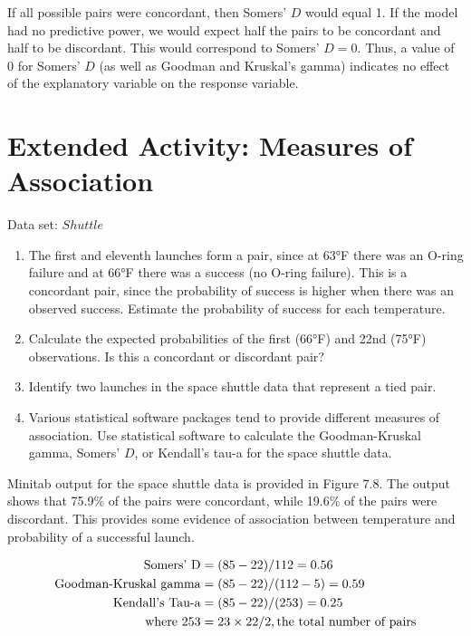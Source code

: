 \documentclass[
]{report}
\providecommand{\tightlist}{%
  \setlength{\itemsep}{0pt}\setlength{\parskip}{0pt}}
\begin{document}
If all possible pairs were concordant, then Somers' \(D\) would equal 1. If the model had no predictive power, we would expect half the pairs to be concordant and half to be discordant. This would correspond to Somers' \(D = 0\). Thus, a value of 0 for Somers' \(D\) (as well as Goodman and Kruskal's gamma) indicates no effect of the explanatory variable on the response variable.

\section*{Extended Activity: Measures of Association}\label{extended-activity-measures-of-association}

Data set: \(Shuttle\)

\begin{enumerate}
\def\labelenumi{\arabic{enumi}.}
\setcounter{enumi}{18}
\tightlist
\item
  The first and eleventh launches form a pair, since at 63°F there was an O-ring failure and at 66°F there was a success (no O-ring failure). This is a concordant pair, since the probability of success is higher when there was an observed success. Estimate the probability of success for each temperature.
\item
  Calculate the expected probabilities of the first (66°F) and 22nd (75°F) observations. Is this a concordant or discordant pair?
\item
  Identify two launches in the space shuttle data that represent a tied pair.
\item
  Various statistical software packages tend to provide different measures of association. Use statistical software to calculate the Goodman-Kruskal gamma, Somers' \(D\), or Kendall's tau-a for the space shuttle data.
\end{enumerate}

Minitab output for the space shuttle data is provided in Figure 7.8. The output shows that 75.9\% of the pairs
were concordant, while 19.6\% of the pairs were discordant. This provides some evidence of association
between temperature and probability of a successful launch.

\begin{align}
\text{Somers’ D} &= (85 - 22)/112 = 0.56 \notag \\
\text{Goodman-Kruskal gamma} &= (85 - 22)/(112 - 5) = 0.59 \notag \\
\text{Kendall’s Tau-a} &= (85 - 22)/(253) = 0.25 \notag \\
\text{where } 253 &= 23 \times 22/2, \text{the total number of pairs} \notag
\end{align}
\end{document}

